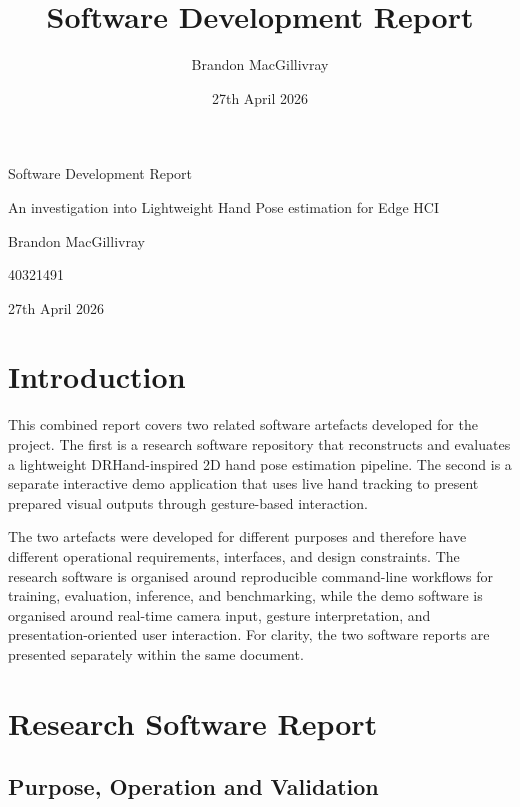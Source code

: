 ﻿\documentclass[11pt,a4paper]{article}
\title{Software Development Report}
\author{Brandon MacGillivray}
\date{27th April 2026}
\begin{document}
\hypersetup{pageanchor=false}
\begin{titlepage}
\centering
{\LARGE Software Development Report\par}
\vspace{1.5cm}
{\large An investigation into Lightweight Hand Pose estimation for Edge HCI\par}
\vspace{1cm}
{\large Brandon MacGillivray\par}
\vspace{0.5cm}
{\large 40321491\par}
\vspace{0.5cm}
{\large 27th April 2026\par}
\vfill
\end{titlepage}
\hypersetup{pageanchor=true}

\tableofcontents
\newpage

\section{Introduction}

This combined report covers two related software artefacts developed for the
project. The first is a research software repository that reconstructs and
evaluates a lightweight DRHand-inspired 2D hand pose estimation pipeline. The
second is a separate interactive demo application that uses live hand tracking
to present prepared visual outputs through gesture-based interaction.

\medskip

\noindent
The two artefacts were developed for different purposes and therefore have
different operational requirements, interfaces, and design constraints. The
research software is organised around reproducible command-line workflows for
training, evaluation, inference, and benchmarking, while the demo software is
organised around real-time camera input, gesture interpretation, and
presentation-oriented user interaction. For clarity, the two software reports
are presented separately within the same document.

\newpage
\section{Research Software Report}

\subsection{Purpose, Operation and Validation}
\end{document}
